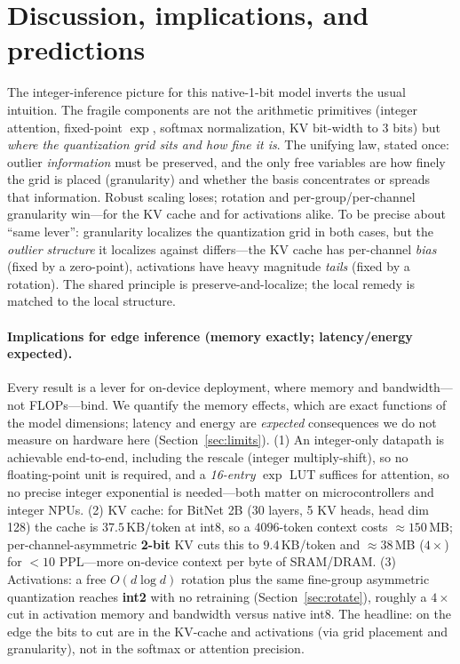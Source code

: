 \documentclass[11pt]{article}
\begin{document}
\section{Discussion, implications, and predictions}
\label{sec:disc}
The integer-inference picture for this native-1-bit model inverts the usual
intuition. The fragile components are not the arithmetic primitives (integer
attention, fixed-point $\exp$, softmax normalization, KV bit-width to 3 bits) but
\emph{where the quantization grid sits and how fine it is}. The unifying law, stated
once: outlier \emph{information} must be preserved, and the only free variables are
how finely the grid is placed (granularity) and whether the basis concentrates or
spreads that information. Robust scaling loses; rotation and per-group/per-channel
granularity win---for the KV cache and for activations alike. To be precise about
``same lever'': granularity localizes the quantization grid in both cases, but the
\emph{outlier structure} it localizes against differs---the KV cache has per-channel
\emph{bias} (fixed by a zero-point), activations have heavy magnitude \emph{tails}
(fixed by a rotation). The shared principle is preserve-and-localize; the local
remedy is matched to the local structure.

\paragraph{Implications for edge inference (memory exactly; latency/energy expected).}
Every result is a lever for on-device deployment, where memory and bandwidth---not
FLOPs---bind. We quantify the memory effects, which are exact functions of the model
dimensions; latency and energy are \emph{expected} consequences we do not measure on
hardware here (Section~\ref{sec:limits}). (1) An integer-only datapath is achievable
end-to-end, including the rescale (integer multiply-shift), so no floating-point unit
is required, and a \emph{16-entry} $\exp$ LUT suffices for attention, so no precise
integer exponential is needed---both matter on microcontrollers and integer NPUs.
(2) KV cache: for BitNet 2B (30 layers, 5 KV heads, head dim 128) the cache is
$37.5$\,KB/token at int8, so a $4096$-token context costs $\approx\!150$\,MB;
per-channel-asymmetric \textbf{2-bit} KV cuts this to $9.4$\,KB/token and
$\approx\!38$\,MB ($4\times$) for $<10$ PPL---more on-device context per byte of
SRAM/DRAM. (3) Activations: a free $O(d\log d)$ rotation plus the same
fine-group asymmetric quantization reaches \textbf{int2} with no retraining
(Section~\ref{sec:rotate}), roughly a $4\times$ cut in activation memory and
bandwidth versus native int8. The headline: on the edge the
bits to cut are in the KV-cache and activations (via grid placement and granularity),
not in the softmax or attention precision.
\end{document}
